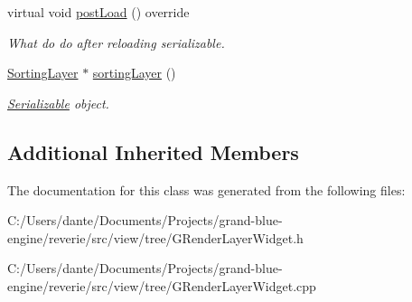 \begin{Indent}
\begin{DoxyCompactItemize}
\mbox{\label{classrev_1_1_view_1_1_render_layer_widget_a9ee8a2cd30008949d3aa1f0103974e3f}} 
virtual void \mbox{\hyperlink{classrev_1_1_view_1_1_render_layer_widget_a9ee8a2cd30008949d3aa1f0103974e3f}{post\+Load}} () override
\begin{DoxyCompactList}\small\item\em What do do after reloading serializable. \end{DoxyCompactList}\item 
\mbox{\label{classrev_1_1_view_1_1_render_layer_widget_a70c7039e6517e0536fa5d8695042c6d3}} 
\mbox{\hyperlink{structrev_1_1_sorting_layer}{Sorting\+Layer}} $\ast$ \mbox{\hyperlink{classrev_1_1_view_1_1_render_layer_widget_a70c7039e6517e0536fa5d8695042c6d3}{sorting\+Layer}} ()
\begin{DoxyCompactList}\small\item\em \mbox{\hyperlink{classrev_1_1_serializable}{Serializable}} object. \end{DoxyCompactList}\end{DoxyCompactItemize}
\end{Indent}
\subsection*{Additional Inherited Members}


The documentation for this class was generated from the following files\+:\begin{DoxyCompactItemize}
\item 
C\+:/\+Users/dante/\+Documents/\+Projects/grand-\/blue-\/engine/reverie/src/view/tree/G\+Render\+Layer\+Widget.\+h\item 
C\+:/\+Users/dante/\+Documents/\+Projects/grand-\/blue-\/engine/reverie/src/view/tree/G\+Render\+Layer\+Widget.\+cpp\end{DoxyCompactItemize}
